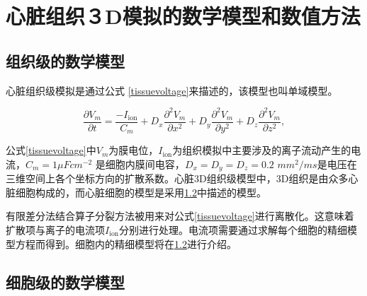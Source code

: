 

\section{心脏组织３D模拟的数学模型和数值方法}

\subsection{组织级的数学模型}
心脏组织级模拟是通过公式 \ref{tissuevoltage}来描述的，该模型也叫单域模型。

\begin{equation}
\frac{\partial V_{m}}{\partial t}=\frac{-I_\mathrm{ion}}{C_{m}} + D_{x}\frac{\partial^{2}V_{m}}{\partial x^{2}}+D_{y}\frac{\partial^{2}V_{m}}{\partial  y^{2}}+D_{z}\frac{\partial^{2}V_{m}}{\partial z^{2}},
\label{tissuevoltage}
\end{equation}

公式\ref{tissuevoltage}中$V_{m}$为膜电位，$I_\mathrm{ion}$为组织模拟中主要涉及的离子流动产生的电流，$C_{m}=1\mu F cm^{-2}$ 是细胞内膜间电容，$D_{x}=D_y=D_z=0.2 $ $mm^{2}/ms$是电压在三维空间上各个坐标方向的扩散系数。心脏3D组织级模型中，3D组织是由众多心脏细胞构成的，而心脏细胞的模型是采用\ref{cellmodel}中描述的模型。

有限差分法结合算子分裂方法被用来对公式\ref{tissuevoltage}进行离散化。这意味着扩散项与离子的电流项$I_\mathrm{ion}$分别进行处理。电流项需要通过求解每个细胞的精细模型方程而得到。细胞内的精细模型将在\ref{cellmodel}进行介绍。

\subsection{细胞级的数学模型}
\label{cellmodel}

